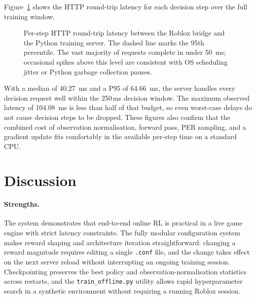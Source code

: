 \documentclass[11pt]{article}
\begin{document}
Figure~\ref{fig:latency} shows the HTTP round-trip latency for each
decision step over the full training window.

\begin{figure}[htbp]
  \centering
  \caption{Per-step HTTP round-trip latency between the Roblox bridge
    and the Python training server. The dashed line marks the 95th
    percentile. The vast majority of requests complete in under
    \SI{50}{ms}; occasional spikes above this level are consistent with
    OS scheduling jitter or Python garbage collection pauses.}
  \label{fig:latency}
\end{figure}

With a median of \SI{40.27}{ms} and a P95 of \SI{64.66}{ms}, the server
handles every decision request well within the 250\,ms decision window.
The maximum observed latency of \SI{104.08}{ms} is less than half of
that budget, so even worst-case delays do not cause decision steps to be
dropped. These figures also confirm that the combined cost of observation
normalisation, forward pass, PER sampling, and a gradient update fits
comfortably in the available per-step time on a standard CPU.

\section{Discussion}
\label{sec:discussion}

\paragraph{Strengths.}
The system demonstrates that end-to-end online RL is practical in a live
game engine with strict latency constraints. The fully modular configuration
system makes reward shaping and architecture iteration straightforward:
changing a reward magnitude requires editing a single \texttt{.conf} file,
and the change takes effect on the next server reload without interrupting
an ongoing training session. Checkpointing preserves the best policy and
observation-normalisation statistics across restarts, and the
\texttt{train\_offline.py} utility allows rapid hyperparameter search in a
synthetic environment without requiring a running Roblox session.
\end{document}
